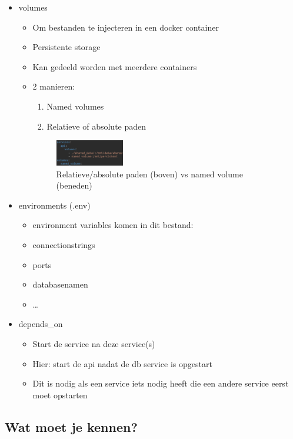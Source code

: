 \documentclass{article}
\begin{document}
\begin{itemize}
\begin{itemize}
    \end{itemize}
    \item volumes
    \begin{itemize}
        \item Om bestanden te injecteren in een docker container
        \item Persistente storage
        \item Kan gedeeld worden met meerdere containers
        \item 2 manieren:
        \begin{enumerate}
            \item Named volumes
            \item Relatieve of absolute paden
        \end{enumerate}
        \begin{figure}[H]
            \centering
            \includegraphics[width=0.3\textwidth]{docker-volumes.png}
            \caption{Relatieve/absolute paden (boven) vs named volume (beneden)}
        \end{figure}
    \end{itemize}
    \item environments (.env)
    \begin{itemize}
        \item environment variables komen in dit bestand:
        \item connectionstrings
        \item ports
        \item databasenamen
        \item \dots
    \end{itemize}
    \item depends\_on
    \begin{itemize}
        \item Start de service na deze service(s)
        \item Hier: start de api nadat de db service is opgestart
        \item Dit is nodig als een service iets nodig heeft die een andere service eerst moet opstarten
    \end{itemize}
\end{itemize}



\subsection{Wat moet je kennen?}
\end{document}
